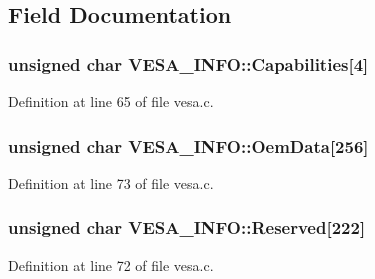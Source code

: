 \subsection{Field Documentation}
\subsubsection[{\texorpdfstring{Capabilities}{Capabilities}}]{\setlength{\rightskip}{0pt plus 5cm}unsigned char V\+E\+S\+A\+\_\+\+I\+N\+F\+O\+::\+Capabilities\mbox{[}4\mbox{]}}\hypertarget{structVESA__INFO_ad758672d9e52736faab1d46d9d39c29a}{}\label{structVESA__INFO_ad758672d9e52736faab1d46d9d39c29a}


Definition at line 65 of file vesa.\+c.

\subsubsection[{\texorpdfstring{Oem\+Data}{OemData}}]{\setlength{\rightskip}{0pt plus 5cm}unsigned char V\+E\+S\+A\+\_\+\+I\+N\+F\+O\+::\+Oem\+Data\mbox{[}256\mbox{]}}\hypertarget{structVESA__INFO_a46a8c524e362968b69202f7210bac1e4}{}\label{structVESA__INFO_a46a8c524e362968b69202f7210bac1e4}


Definition at line 73 of file vesa.\+c.

\subsubsection[{\texorpdfstring{Reserved}{Reserved}}]{\setlength{\rightskip}{0pt plus 5cm}unsigned char V\+E\+S\+A\+\_\+\+I\+N\+F\+O\+::\+Reserved\mbox{[}222\mbox{]}}\hypertarget{structVESA__INFO_aa2b5b63d3b2d14b3abbd73f749e07fa5}{}\label{structVESA__INFO_aa2b5b63d3b2d14b3abbd73f749e07fa5}


Definition at line 72 of file vesa.\+c.

